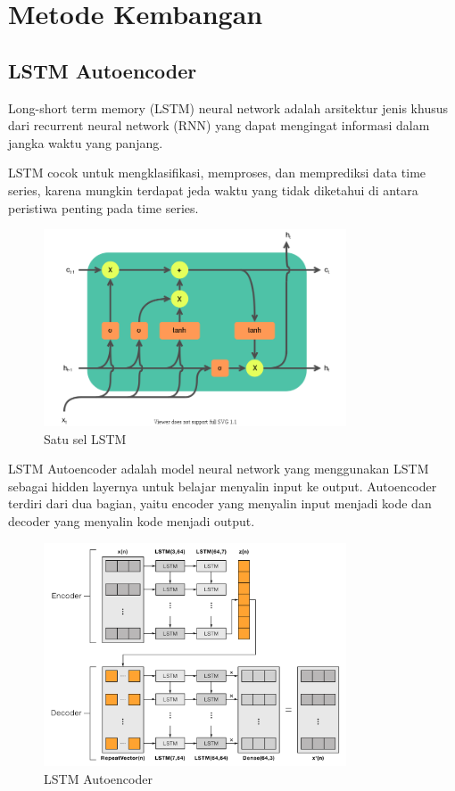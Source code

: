 \chapter{Metode Kembangan}

\section{LSTM Autoencoder}

Long-short term memory (LSTM) neural network adalah arsitektur jenis khusus dari recurrent neural network (RNN) yang dapat mengingat informasi dalam jangka waktu yang panjang.

LSTM cocok untuk mengklasifikasi, memproses, dan memprediksi data time series, karena mungkin terdapat jeda waktu yang tidak diketahui di antara peristiwa penting pada time series.

\begin{figure}[h]
    \centering
    \includegraphics[width=0.8\textwidth]{resources/LSTM_cell.png}
    \caption{Satu sel LSTM}
\end{figure}

LSTM Autoencoder adalah model neural network yang menggunakan LSTM sebagai hidden layernya untuk belajar menyalin input ke output. Autoencoder terdiri dari dua bagian, yaitu encoder yang menyalin input menjadi kode dan decoder yang menyalin kode menjadi output.

\begin{figure}[h]
    \centering
    \includegraphics[width=0.8\textwidth]{resources/lstm_ae.png}
    \caption{LSTM Autoencoder}
\end{figure}


